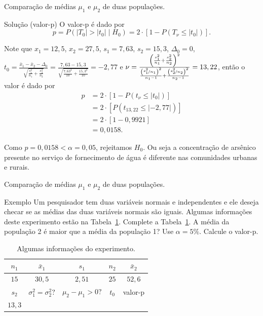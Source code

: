 \documentclass[9pt]{beamer}
\begin{document}
\begin{frame}{Comparação de médias $\mu_1$ e $\mu_2$ de duas populações.}

\begin{block}{Solução (valor-p)}
	O valor-p é dado por
	$$p = P(\lvert T_0 \rvert > \lvert t_0 \rvert  \mid H_0) = 2 \cdot \left[1 - P(T_\nu \leq \lvert t_0 \rvert)\right].$$
	
	Note que $x_1=12,5$, $x_2=27,5$, $s_1=7,63$, $s_2=15,3$, $\Delta_0=0$, $t_0 = \frac{\bar{x}_1 - \bar{x}_2 - \Delta_0}{\sqrt{\frac{s_1^2}{n_1} + \frac{s_2^2}{n_2}}} = \frac{7,63 - 15,3}{\sqrt{\frac{7,63^2}{10} + \frac{15,3^2}{10}}}=-2,77$ e $\nu = \frac{\left(\frac{s_1^2}{n_1} + \frac{s_2^2}{n_2} \right)^2}{\frac{\left(\nicefrac{s_1^2}{n_1}\right)^2}{n_1-1} + \frac{\left(\nicefrac{s_2^2}{n_2}\right)^2}{n_2-1}} = 13,22$, então o valor é dado por
	\begin{align*}
	p &=2\cdot \left[1- P(t_\nu \leq \lvert  t_0\rvert)\right]\\
	&=2\cdot \left[ P(t_{13,22} \leq \lvert -2,77 \rvert)\right]\\
	&= 2 \cdot \left[ 1 - 0,9921 \right]\\
	&= 0,0158.
	\end{align*}
	
	Como $p = 0,0158 < \alpha=0,05$, rejeitamos $H_0$. Ou seja a concentração de arsênico presente no serviço de fornecimento de água é diferente nas comunidades urbanas e rurais.
\end{block}

\end{frame}

\begin{frame}{Comparação de médias $\mu_1$ e $\mu_2$ de duas populações.}

\begin{block}{Exemplo}
	Um pesquisador tem duas variáveis normais e independentes e ele deseja checar se as médias das duas variáveis normais são iguais. Algumas informações deste experimento estão na Tabela~\ref{tab:experimento-h1-upper}. Complete a Tabela~\ref{tab:experimento-h1-upper}. A média da população 2 é maior que a média da população 1? Use $\alpha=5\%$. Calcule o valor-p.
\end{block}

\begin{table}[htbp]
	\centering
	\begin{tabular}{c|c|c|c|c}
		\toprule[0.1cm]
		$n_1$ & $\bar{x}_1$ & $s_1$ & $n_2$ & $\bar{x}_2$\\ \midrule[0.025cm]
		$15$ & $30,5$ & $2,51$ & $25$ & $52,6$\\ \midrule[0.05cm]
		$s_2$ & $\sigma_1^2 = \sigma_2^2?$ & $\mu_2 - \mu_1 > 0?$ & $t_0$ & valor-p\\ \midrule[0.025cm]
		$13,3$ & & & & \\ \bottomrule[0.1cm]
	\end{tabular}
	\caption{Algumas informações do experimento.}
	\label{tab:experimento-h1-upper}
\end{table}

\end{frame}
\end{document}
